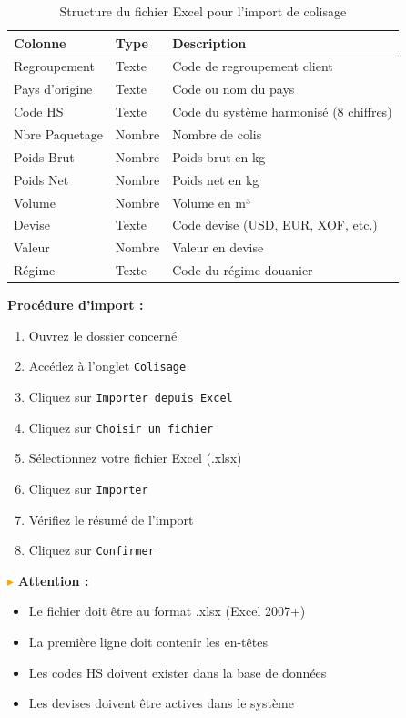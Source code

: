\documentclass[12pt,a4paper]{report}
\begin{document}
\begin{table}[H]
\centering
\small
\begin{tabular}{|l|l|p{5cm}|}
\hline
\textbf{Colonne} & \textbf{Type} & \textbf{Description} \\
\hline
Regroupement & Texte & Code de regroupement client \\
\hline
Pays d'origine & Texte & Code ou nom du pays \\
\hline
Code HS & Texte & Code du système harmonisé (8 chiffres) \\
\hline
Nbre Paquetage & Nombre & Nombre de colis \\
\hline
Poids Brut & Nombre & Poids brut en kg \\
\hline
Poids Net & Nombre & Poids net en kg \\
\hline
Volume & Nombre & Volume en m³ \\
\hline
Devise & Texte & Code devise (USD, EUR, XOF, etc.) \\
\hline
Valeur & Nombre & Valeur en devise \\
\hline
Régime & Texte & Code du régime douanier \\
\hline
\end{tabular}
\caption{Structure du fichier Excel pour l'import de colisage}
\end{table}

\textbf{Procédure d'import :}

\begin{enumerate}[leftmargin=*]
    \item Ouvrez le dossier concerné
    \item Accédez à l'onglet \texttt{Colisage}
    \item Cliquez sur \texttt{Importer depuis Excel}
    \item Cliquez sur \texttt{Choisir un fichier}
    \item Sélectionnez votre fichier Excel (.xlsx)
    \item Cliquez sur \texttt{Importer}
    \item Vérifiez le résumé de l'import
    \item Cliquez sur \texttt{Confirmer}
\end{enumerate}

\textcolor{orange}{$\blacktriangleright$} \textbf{Attention :} 
\begin{itemize}[leftmargin=*]
    \item Le fichier doit être au format .xlsx (Excel 2007+)
    \item La première ligne doit contenir les en-têtes
    \item Les codes HS doivent exister dans la base de données
    \item Les devises doivent être actives dans le système
\end{itemize}
\end{document}
